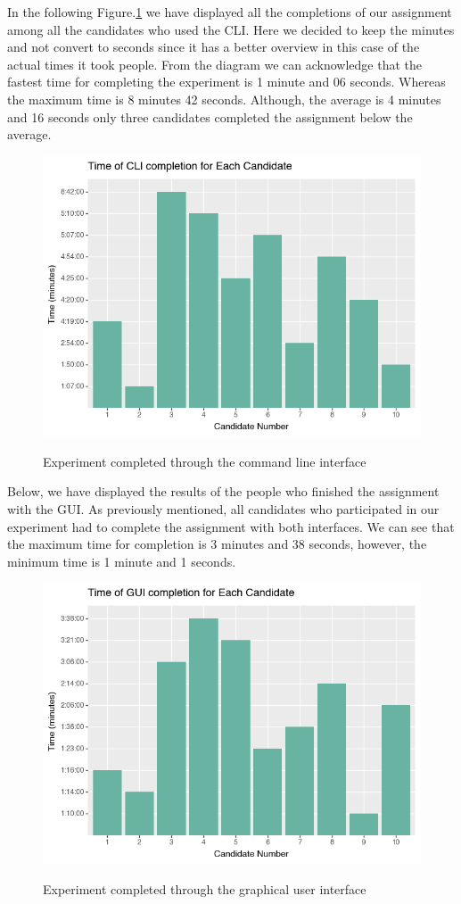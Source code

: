 \documentclass[]{report}
\begin{document}
In the following  Figure.\ref{fig: 20} we have displayed all the completions of our assignment among all the candidates who used the CLI. Here we decided to keep the minutes and not convert to seconds since it has a better overview in this case of the actual times it took people. From the diagram we can acknowledge that the fastest time for completing the experiment is 1 minute and 06 seconds. Whereas the maximum time is 8 minutes 42 seconds. Although, the average is 4 minutes and 16 seconds only three candidates completed the assignment below the average. 

\begin{figure}[H]
	\centering
	\includegraphics[width=0.75\linewidth]{ExperimentCli}\\
	\caption{Experiment completed through the command line interface}
	\label{fig: 20}
\end{figure}

Below, we have displayed the results of the people who finished the assignment with the GUI. As previously mentioned, all candidates who participated in our experiment had to complete the assignment with both interfaces. We can see that the maximum time for completion is 3 minutes and 38 seconds, however, the minimum time is 1 minute and 1 seconds.
\begin{figure}[H]
	\centering
	\includegraphics[width=0.75\linewidth]{ExperimentGui}\\
	\caption{Experiment completed through the graphical user interface}
	\label{fig: 21}
\end{figure}
	\newpage
	
\end{document}
